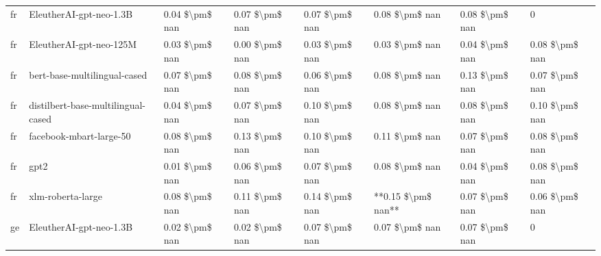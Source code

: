 \begin{tabular}{llllllll}
      fr &            EleutherAI-gpt-neo-1.3B & 0.04 \$\textbackslash pm\$ nan &            0.07 \$\textbackslash pm\$ nan &        0.07 \$\textbackslash pm\$ nan &         0.08 \$\textbackslash pm\$ nan &                          0.08 \$\textbackslash pm\$ nan &                  0 \\
      fr &            EleutherAI-gpt-neo-125M & 0.03 \$\textbackslash pm\$ nan &            0.00 \$\textbackslash pm\$ nan &        0.03 \$\textbackslash pm\$ nan &         0.03 \$\textbackslash pm\$ nan &                          0.04 \$\textbackslash pm\$ nan &     0.08 \$\textbackslash pm\$ nan \\
      fr &       bert-base-multilingual-cased & 0.07 \$\textbackslash pm\$ nan &            0.08 \$\textbackslash pm\$ nan &        0.06 \$\textbackslash pm\$ nan &         0.08 \$\textbackslash pm\$ nan &                          0.13 \$\textbackslash pm\$ nan &     0.07 \$\textbackslash pm\$ nan \\
      fr & distilbert-base-multilingual-cased & 0.04 \$\textbackslash pm\$ nan &            0.07 \$\textbackslash pm\$ nan &        0.10 \$\textbackslash pm\$ nan &         0.08 \$\textbackslash pm\$ nan &                          0.08 \$\textbackslash pm\$ nan &     0.10 \$\textbackslash pm\$ nan \\
      fr &            facebook-mbart-large-50 & 0.08 \$\textbackslash pm\$ nan &            0.13 \$\textbackslash pm\$ nan &        0.10 \$\textbackslash pm\$ nan &         0.11 \$\textbackslash pm\$ nan &                          0.07 \$\textbackslash pm\$ nan &     0.08 \$\textbackslash pm\$ nan \\
      fr &                               gpt2 & 0.01 \$\textbackslash pm\$ nan &            0.06 \$\textbackslash pm\$ nan &        0.07 \$\textbackslash pm\$ nan &         0.08 \$\textbackslash pm\$ nan &                          0.04 \$\textbackslash pm\$ nan &     0.08 \$\textbackslash pm\$ nan \\
      fr &                  xlm-roberta-large & 0.08 \$\textbackslash pm\$ nan &            0.11 \$\textbackslash pm\$ nan &        0.14 \$\textbackslash pm\$ nan &     **0.15 \$\textbackslash pm\$ nan** &                          0.07 \$\textbackslash pm\$ nan &     0.06 \$\textbackslash pm\$ nan \\
      ge &            EleutherAI-gpt-neo-1.3B & 0.02 \$\textbackslash pm\$ nan &            0.02 \$\textbackslash pm\$ nan &        0.07 \$\textbackslash pm\$ nan &         0.07 \$\textbackslash pm\$ nan &                          0.07 \$\textbackslash pm\$ nan &                  0 \\

\end{tabular}
